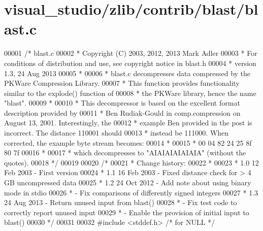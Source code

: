 \hypertarget{visual__studio_2zlib_2contrib_2blast_2blast_8c_source}{}\section{visual\+\_\+studio/zlib/contrib/blast/blast.c}
\label{visual__studio_2zlib_2contrib_2blast_2blast_8c_source}

\begin{DoxyCode}
00001 \textcolor{comment}{/* blast.c}
00002 \textcolor{comment}{ * Copyright (C) 2003, 2012, 2013 Mark Adler}
00003 \textcolor{comment}{ * For conditions of distribution and use, see copyright notice in blast.h}
00004 \textcolor{comment}{ * version 1.3, 24 Aug 2013}
00005 \textcolor{comment}{ *}
00006 \textcolor{comment}{ * blast.c decompresses data compressed by the PKWare Compression Library.}
00007 \textcolor{comment}{ * This function provides functionality similar to the explode() function of}
00008 \textcolor{comment}{ * the PKWare library, hence the name "blast".}
00009 \textcolor{comment}{ *}
00010 \textcolor{comment}{ * This decompressor is based on the excellent format description provided by}
00011 \textcolor{comment}{ * Ben Rudiak-Gould in comp.compression on August 13, 2001.  Interestingly, the}
00012 \textcolor{comment}{ * example Ben provided in the post is incorrect.  The distance 110001 should}
00013 \textcolor{comment}{ * instead be 111000.  When corrected, the example byte stream becomes:}
00014 \textcolor{comment}{ *}
00015 \textcolor{comment}{ *    00 04 82 24 25 8f 80 7f}
00016 \textcolor{comment}{ *}
00017 \textcolor{comment}{ * which decompresses to "AIAIAIAIAIAIA" (without the quotes).}
00018 \textcolor{comment}{ */}
00019 
00020 \textcolor{comment}{/*}
00021 \textcolor{comment}{ * Change history:}
00022 \textcolor{comment}{ *}
00023 \textcolor{comment}{ * 1.0  12 Feb 2003     - First version}
00024 \textcolor{comment}{ * 1.1  16 Feb 2003     - Fixed distance check for > 4 GB uncompressed data}
00025 \textcolor{comment}{ * 1.2  24 Oct 2012     - Add note about using binary mode in stdio}
00026 \textcolor{comment}{ *                      - Fix comparisons of differently signed integers}
00027 \textcolor{comment}{ * 1.3  24 Aug 2013     - Return unused input from blast()}
00028 \textcolor{comment}{ *                      - Fix test code to correctly report unused input}
00029 \textcolor{comment}{ *                      - Enable the provision of initial input to blast()}
00030 \textcolor{comment}{ */}
00031 
00032 \textcolor{preprocessor}{#include <stddef.h>}             \textcolor{comment}{/* for NULL */}

\end{DoxyCode}

